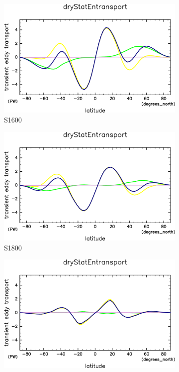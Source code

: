 \documentclass[body]{subfiles}
\begin{document}
\begin{figure}[t]
\begin{subfigure}{.4\textwidth}
	\end{subfigure}
	\begin{subfigure}{.4\textwidth}
		\centering
		\includegraphics[width=\columnwidth]{S1600/MeriHeatTrans@dryStatEn,time=3650:4015-crop-rotate.pdf}
		\caption{S1600}\label{乾燥静的エネルギーS1600}
	\end{subfigure}
	\begin{subfigure}{.4\textwidth}
		\centering
		\includegraphics[width=\columnwidth]{S1800/MeriHeatTrans@dryStatEn,time=3650:4015-crop-rotate.pdf}
		\caption{S1800}\label{乾燥静的エネルギーS1800}
	\end{subfigure}
	\begin{subfigure}{.4\textwidth}
		\centering
		\includegraphics[width=\columnwidth]{S2000/MeriHeatTrans@dryStatEn,time=7300:7665-crop-rotate.pdf}

\end{subfigure}
\end{figure}
\end{document}
